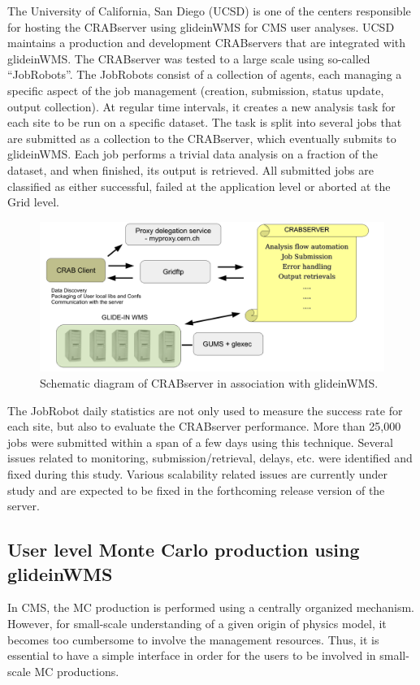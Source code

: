 \documentclass[a4paper]{jpconf}
\begin{document}
The University of California, San Diego (UCSD) is one of the centers responsible for hosting 
the CRABserver using glideinWMS for CMS user analyses. UCSD maintains a production and development CRABservers 
that are integrated with glideinWMS. The CRABserver was tested to a large 
scale using so-called ``JobRobots''. The JobRobots consist of a collection of agents, each 
managing a specific aspect of the job management (creation, submission, status
update, output collection). At regular time intervals, it creates a new analysis task
for each site to be run on a specific dataset. The
task is split into several jobs that are submitted as a collection to
the CRABserver, which eventually submits to glideinWMS. Each job
performs a trivial data analysis on a fraction of the dataset, and when
finished, its output is retrieved. All submitted jobs are classified
as either successful, failed at the application level or aborted at the Grid
level.
\begin{figure}
\begin{center}
\includegraphics[scale=0.4]{crabserver}
\end{center}
\caption{Schematic diagram of CRABserver in association with glideinWMS.}
\label{fig:crabserver}
\end{figure}
The JobRobot daily statistics are not only used to measure the success rate for each site, 
but also to evaluate the CRABserver performance. More than 25,000 jobs were submitted within a span of a 
few days using this technique. Several issues related to monitoring, 
submission/retrieval, delays, etc. were identified and fixed during this study. Various scalability
related issues are currently under study and are expected to be fixed in the forthcoming
release version of the server.
\subsection{User level Monte Carlo production using glideinWMS}
In CMS, the MC production is performed using a centrally organized mechanism. However,
for small-scale understanding of a given origin of physics model, it becomes too cumbersome
to involve the management resources. Thus, it is essential to have a simple interface
in order for the users to be involved in small-scale MC productions. 
\end{document}
